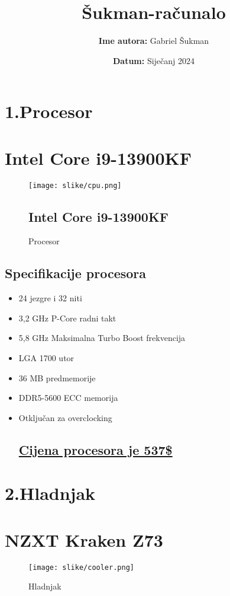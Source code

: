 \documentclass[12pt]{article}
\title{\textbf{\Huge Šukman-računalo}}
\author{\textbf{Ime autora:} Gabriel Šukman}
\date{\textbf{Datum:} Siječanj 2024}
\begin{document}
\maketitle

\newpage
\section*{\Huge 1.Procesor}
\section*{\large Intel Core i9-13900KF}
\begin{figure}[h]
    \centering
    \texttt{[image: slike/cpu.png]} 
    \caption{Procesor}
\subsection{Intel Core i9-13900KF}
\end{figure}
\subsection*{Specifikacije procesora}
\begin{itemize}[label=--, left=0em]
    \item 24 jezgre i 32 niti
    \item 3,2 GHz P-Core radni takt
    \item 5,8 GHz Maksimalna Turbo Boost frekvencija
    \item LGA 1700 utor
    \item 36 MB predmemorije
    \item DDR5-5600 ECC memorija
    \item Otključan za overclocking
\subsection*{\href{https://www.amazon.com/Intel-i9-13900KF-Desktop-Processor-P-cores/dp/B0BCFM3CJ4/ref=sr_1_1_sspa}{Cijena procesora je 537\$}}
\end{itemize}

\newpage
\section*{\Huge 2.Hladnjak}
\section*{\large NZXT Kraken Z73}
\begin{figure}[h]
    \centering
    \texttt{[image: slike/cooler.png]} 
    \caption{Hladnjak}
\end{figure}
\end{document}
